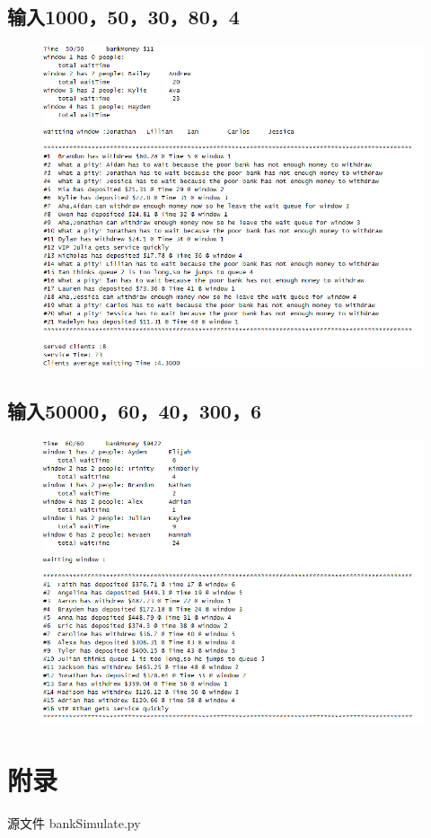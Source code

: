 \documentclass[UTF8]{ctexart}
\begin{document}
\subsection{输入1000，50，30，80，4}
\begin{figure}[H]
  \centering
  \includegraphics[width=1\textwidth]{result2.png}
\end{figure}
\subsection{输入50000，60，40，300，6}
\begin{figure}[H]
  \centering
  \includegraphics[width=1\textwidth]{result3.png}
\end{figure}
\section{附录}
源文件
bankSimulate.py
\end{document}
